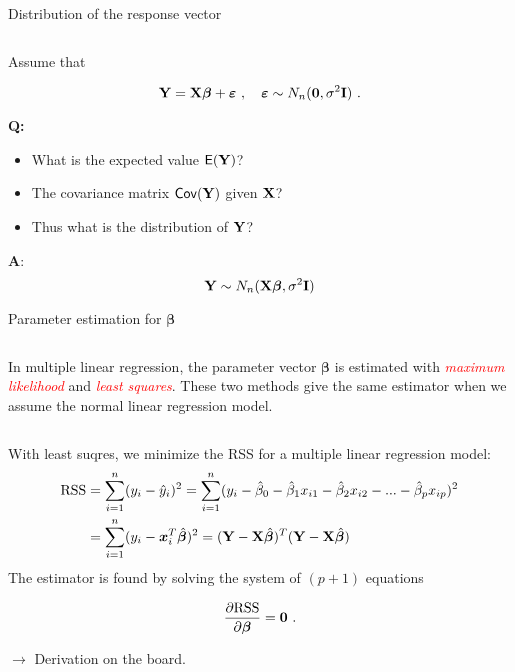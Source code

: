 \documentclass[10pt,ignorenonframetext,]{beamer}
\begin{document}
\begin{frame}

\begin{block}{Distribution of the response vector}

\(~\)

Assume that

\[{\bf Y=X \boldsymbol\beta}+{\boldsymbol \varepsilon} \ , \quad \boldsymbol\varepsilon\sim N_n({\bf 0},\sigma^2 {\bf I}) \ . \]

\vspace{4mm}

\textbf{Q:}

\begin{itemize}
\item
  What is the expected value \(\mathsf{E}(\bf Y)\)?
\item
  The covariance matrix \(\mathsf{Cov}(\bf Y)\) given \(\bf{X}\)?
\item
  Thus what is the distribution of \(\bf Y\)?
\end{itemize}

\end{block}

\end{frame}

\begin{frame}

\textbf{A}:
\[ {\bf Y} \sim N_{n}({\bf X} {\boldsymbol\beta},\sigma^2 {\bf I})\]

\end{frame}

\begin{frame}

\begin{block}{Parameter estimation for \(\boldsymbol{\beta}\)}

\(~\)

In multiple linear regression, the parameter vector \(\boldsymbol\beta\)
is estimated with \emph{\textcolor{red}{maximum likelihood}} and
\emph{\textcolor{red}{least squares}}. These two methods give the same
estimator when we assume the normal linear regression model.

\(~\)

With least suqres, we minimize the RSS for a multiple linear regression
model:
\[\begin{aligned} \text{RSS} &=\sum_{i=1}^n (y_i - \hat y_i)^2 = \sum_{i=1}^n (y_i - \hat \beta_0 - \hat \beta_1 x_{i1} - \hat \beta_2 x_{i2} -...-\hat \beta_p x_{ip} )^2 \\
&= \sum_{i=1}^n (y_i-{\boldsymbol x}_i^T \hat{\boldsymbol\beta})^2=({\bf Y}-{\bf X}\hat{\boldsymbol{\beta}})^T({\bf Y}-{\bf X}\hat{\boldsymbol{\beta}})\end{aligned}\]
The estimator is found by solving the system of \((p+1)\) equations

\[\frac{\partial \text{RSS}}{\partial \boldsymbol \beta}={\bf 0} \ .\]

\(\rightarrow\) Derivation on the board.

\end{block}

\end{frame}
\end{document}
